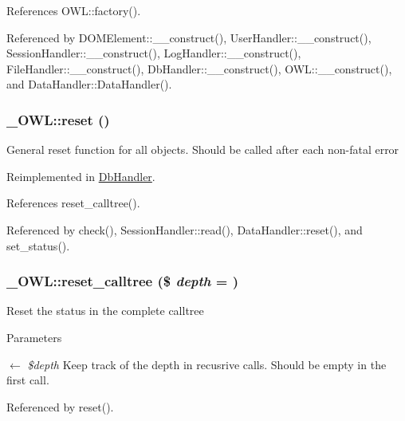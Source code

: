 References OWL::factory().



Referenced by DOMElement::\_\-\_\-construct(), UserHandler::\_\-\_\-construct(), SessionHandler::\_\-\_\-construct(), LogHandler::\_\-\_\-construct(), FileHandler::\_\-\_\-construct(), DbHandler::\_\-\_\-construct(), OWL::\_\-\_\-construct(), and DataHandler::DataHandler().

\subsubsection[{reset}]{\setlength{\rightskip}{0pt plus 5cm}\_\-OWL::reset ()}\label{class__OWL_a2f2a042bcf31965194c03033df0edc9b}
General reset function for all objects. Should be called after each non-\/fatal error 

Reimplemented in \hyperlink{classDbHandler_a9982df4830f05803935bb31bac7fae3d}{DbHandler}.



References reset\_\-calltree().



Referenced by check(), SessionHandler::read(), DataHandler::reset(), and set\_\-status().

\subsubsection[{reset\_\-calltree}]{\setlength{\rightskip}{0pt plus 5cm}\_\-OWL::reset\_\-calltree (\$ {\em depth} = {})}\label{class__OWL_a91389e63fc76f6513147f302cbd92a2e}
Reset the status in the complete calltree


\begin{DoxyParams}{Parameters}
\item[\mbox{$\leftarrow$} {\em \$depth}]Keep track of the depth in recusrive calls. Should be empty in the first call. \end{DoxyParams}


Referenced by reset().

